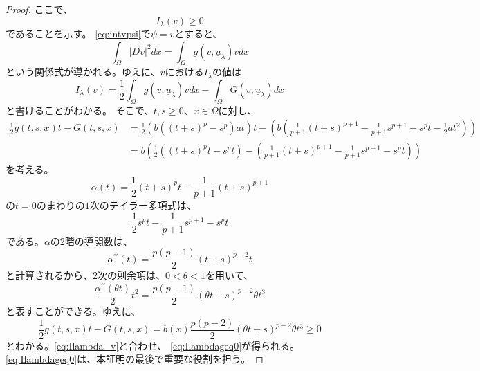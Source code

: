 \begin{proof}
 ここで、
 \begin{equation}
  I_\lambda(v) \geq 0 \label{eq:Ilambdageq0}
 \end{equation}
 であることを示す。
 \eqref{eq:intvpsi}で$\psi = v$とすると、
 \begin{equation}
  \int_\Omega \lvert Dv \rvert^2 dx = \int_\Omega g(v,
   \underline{u}_\lambda)v dx \label{eq:v_kankei}
 \end{equation}
 という関係式が導かれる。ゆえに、$v$における$I_\lambda$の値は
 \begin{equation}
  I_\lambda (v) = \frac{1}{2} \int_\Omega g(v, \underline{u}_\lambda)
   v dx - \int_\Omega G(v, \underline{u}_\lambda) dx \label{eq:Ilambda_v}
 \end{equation}
 と書けることがわかる。
 そこで、$t, s \geq 0$、$x \in \Omega$に対し、
 \begin{align*}
  \frac{1}{2} g(t, s, x) t - G(t, s, x) &= \frac{1}{2} \left(b \left(
  (t+s)^p - s^p \right) at \right)t - \left( b \left(
  \frac{1}{p+1}(t+s)^{p+1} - \frac{1}{p+1}s^{p+1} - s^p t -
  \frac{1}{2}at^2  \right) \right) \\
  &= b \left( \frac{1}{2} \left( (t+s)^pt - s^pt \right) -\left(
  \frac{1}{p+1} (t+s)^{p+1} - \frac{1}{p+1} s^{p+1} - s^p t \right) \right)
 \end{align*}
 を考える。
 \[
  \alpha(t) = \frac{1}{2} (t+s)^p t - \frac{1}{p+1}(t+s)^{p+1}
 \]
 の$t = 0$のまわりの$1$次のテイラー多項式は、
 \[
  \frac{1}{2} s^p t - \frac{1}{p+1}s^{p+1} - s^p t
 \]
 である。$\alpha$の$2$階の導関数は、
 \[
  \alpha^{\prime\prime}(t) = \frac{p(p-1)}{2}(t+s)^{p-2}t
 \]
 と計算されるから、$2$次の剰余項は、$0 < \theta < 1$を用いて、
 \[
  \frac{\alpha^{\prime\prime}(\theta t)}{2} t^2 =
 \frac{p(p-1)}{2}(\theta t + s)^{p-2} \theta t^3
 \]
 と表すことができる。ゆえに、
 \[
  \frac{1}{2} g(t, s, x)t - G(t, s, x) = b(x) \frac{p(p-2)}{2} (\theta
 t + s)^{p-2} \theta t^3 \geq 0
 \]
 とわかる。\eqref{eq:Ilambda_v}と合わせ、
 \eqref{eq:Ilambdageq0}が得られる。
 \eqref{eq:Ilambdageq0}は、本証明の最後で重要な役割を担う。


\end{proof}
